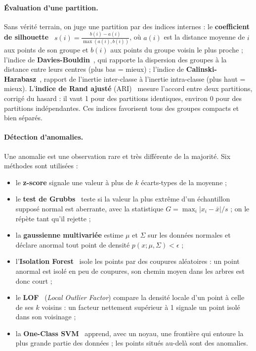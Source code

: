 \paragraph{Évaluation d'une partition.} Sans vérité terrain, on juge une partition par des indices internes : le \textbf{coefficient de silhouette}~\cite{rousseeuw1987} $s(i) = \frac{b(i) - a(i)}{\max(a(i), b(i))}$, où $a(i)$ est la distance moyenne de $i$ aux points de son groupe et $b(i)$ aux points du groupe voisin le plus proche ; l'indice de \textbf{Davies-Bouldin}~\cite{davies1979}, qui rapporte la dispersion des groupes à la distance entre leurs centres (plus bas = mieux) ; l'indice de \textbf{Calinski-Harabasz}~\cite{calinski1974}, rapport de l'inertie inter-classe à l'inertie intra-classe (plus haut = mieux). L'\textbf{indice de Rand ajusté} (ARI)~\cite{hubert1985} mesure l'accord entre deux partitions, corrigé du hasard : il vaut 1 pour des partitions identiques, environ 0 pour des partitions indépendantes. Ces indices favorisent tous des groupes compacts et bien séparés.

\paragraph{Détection d'anomalies.} Une anomalie est une observation rare et très différente de la majorité. Six méthodes sont utilisées :
\begin{itemize}
  \item le \textbf{z-score} signale une valeur à plus de $k$ écarts-types de la moyenne ;
  \item le \textbf{test de Grubbs}~\cite{grubbs1969} teste si la valeur la plus extrême d'un échantillon supposé normal est aberrante, avec la statistique $G = \max_i |x_i - \bar x| / s$ ; on le répète tant qu'il rejette ;
  \item la \textbf{gaussienne multivariée} estime $\mu$ et $\Sigma$ sur les données normales et déclare anormal tout point de densité $p(x;\mu,\Sigma) < \epsilon$ ;
  \item l'\textbf{Isolation Forest}~\cite{liu2008} isole les points par des coupures aléatoires : un point anormal est isolé en peu de coupures, son chemin moyen dans les arbres est donc court ;
  \item le \textbf{LOF}~\cite{breunig2000} (\emph{Local Outlier Factor}) compare la densité locale d'un point à celle de ses $k$ voisins : un facteur nettement supérieur à 1 signale un point isolé dans son voisinage ;
  \item la \textbf{One-Class SVM}~\cite{scholkopf2001} apprend, avec un noyau, une frontière qui entoure la plus grande partie des données ; les points situés au-delà sont des anomalies.
\end{itemize}

